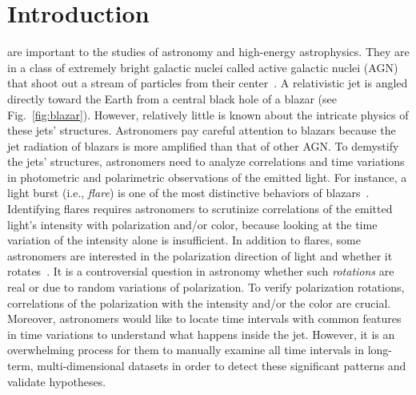 \ifCLASSOPTIONcompsoc
{}
\else
\section{Introduction}
\label{sec:introduction}
\fi
{} are important to the studies of astronomy and high-energy astrophysics. 
They are in a class of extremely bright galactic nuclei called active galactic nuclei (AGN) that shoot out a stream of particles from their center~\cite{Antonucci1993a}. 
A relativistic jet is angled directly toward the Earth from a central black hole of a blazar (see Fig.~\ref{fig:blazar}).
However, relatively little is known about the intricate physics of these jets' structures.
Astronomers pay careful attention to blazars
because the jet radiation of blazars is more amplified than that of other AGN.
To demystify the jets' structures,
astronomers need to analyze correlations and time variations in photometric and polarimetric observations of the emitted light.
For instance, a light burst (i.e., \textit{flare}) is one of the most distinctive behaviors of blazars~\cite{Bednarek1999, Atoyan2001}.
Identifying flares requires astronomers to scrutinize correlations of the emitted light's intensity with polarization and/or color, because looking at the time variation of the intensity alone is insufficient.
In addition to flares, some astronomers are interested in the polarization direction of light and whether it rotates~\cite{Marscher2008, Uemura2017}.
It is a controversial question in astronomy whether such \textit{rotations} are real or due to random variations of polarization.
To verify polarization rotations, correlations of the polarization with the intensity and/or the color are crucial.
Moreover, astronomers would like to locate time intervals with common features in  time variations
to understand what happens inside the jet.
However, it is an overwhelming process for them to manually examine all time intervals in long-term, multi-dimensional datasets in order to detect these significant patterns and validate hypotheses.

